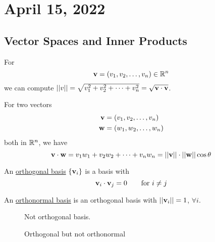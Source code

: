 \section{April 15, 2022}
\subsection{Vector Spaces and Inner Products}
For
\[\mathbf{v} = \left( v_1, v_2, \dots, v_n \right)\in\mathbb R^n\]
we can compute $||v|| = \sqrt{v_1^2 + v_2^2 + \cdots + v_n^2} = \sqrt{\mathbf{v}\cdot \mathbf{v}}$.

For two vectors
\begin{align*}
    \mathbf{v} & =\left( v_1, v_2, \dots, v_n \right) \\
    \mathbf{w} & =\left( w_1, w_2, \dots, w_n \right)
\end{align*}
both in $\mathbb R^n$, we have
\[\mathbf{v}\cdot \mathbf{w} = v_1w_1 + v_2w_2 + \cdots + v_nw_n = ||\mathbf{v}||\cdot ||\mathbf{w}||\cos{\theta}\]
\begin{definition}
    An \ul{orthogonal basis} $\left\{ \mathbf{v}_i \right\}$ is a basis with
    \[\mathbf{v}_i\cdot \mathbf{v}_j = 0 \qquad \text{for $i\neq j$}\]
\end{definition}
\begin{definition}
    An \ul{orthonormal basis} is an orthogonal basis with $||\mathbf{v}_i|| = 1$, $\forall i$.
\end{definition}

\begin{figure}[ht!]
    \begin{center}
    \end{center}
    \caption{Not orthogonal basis. }
\end{figure}

\begin{figure}[ht!]
    \begin{center}
    \end{center}
    \caption{Orthogonal but not orthonormal }
\end{figure}

